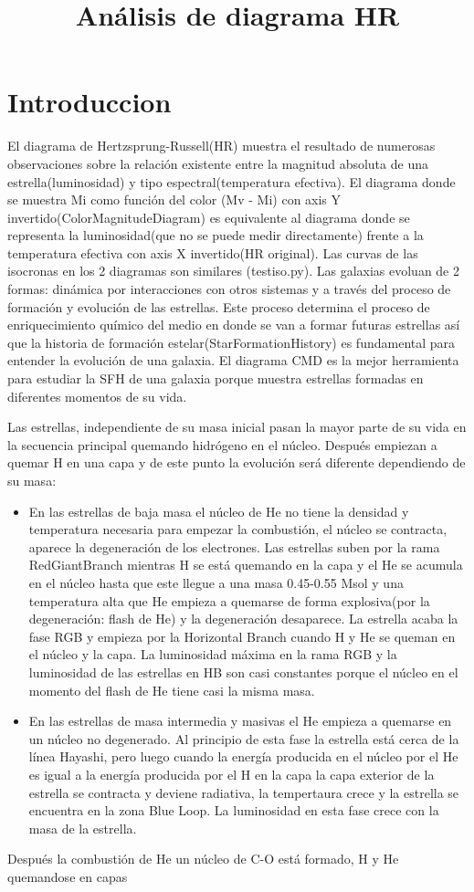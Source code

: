 \documentclass[10pt]{book}
\title{Análisis de diagrama HR}
\date{}
\begin{document}
\section*{Introduccion}



  El diagrama de Hertzsprung-Russell(HR) muestra el resultado de numerosas observaciones sobre la relación existente entre la magnitud absoluta de una estrella(luminosidad) y tipo espectral(temperatura efectiva).
El diagrama donde se muestra Mi como función del color (Mv - Mi) con axis Y invertido(ColorMagnitudeDiagram) es equivalente al diagrama donde se representa la luminosidad(que no se puede medir directamente) frente a la temperatura efectiva con axis X invertido(HR original). Las curvas de las isocronas en los 2 diagramas son similares (testiso.py). 
Las galaxias evoluan de 2 formas: dinámica por interacciones con otros sistemas y a través del proceso de formación y evolución de las estrellas. Este proceso determina el proceso de enriquecimiento químico del medio en donde se van a formar futuras estrellas así que la historia de formación estelar(StarFormationHistory) es fundamental para entender la evolución de una galaxia. 
El diagrama CMD es la mejor herramienta para estudiar la SFH de
una galaxia porque muestra estrellas formadas en diferentes momentos de su vida.

Las estrellas, independiente de su masa inicial pasan la mayor parte de su vida en la secuencia principal quemando hidrógeno en el núcleo. Después empiezan a quemar H en una capa y de este punto la evolución será diferente dependiendo de su masa:
\begin{itemize}
\item En las estrellas de baja masa el núcleo de He no tiene la densidad y temperatura necesaria para empezar la combustión, el núcleo se contracta, aparece la degeneración de los electrones. 
Las estrellas suben por la rama RedGiantBranch mientras H se está quemando en la capa y el He se acumula en el núcleo hasta que este llegue a una masa 0.45-0.55 Msol y una temperatura alta  que He empieza a quemarse de forma explosiva(por la degeneración: flash de He) y la degeneración desaparece. La estrella acaba la fase RGB y empieza por la Horizontal Branch cuando H y He se queman en el núcleo y la capa. La luminosidad máxima en la rama RGB y la luminosidad de las estrellas en HB son casi constantes porque el núcleo en el momento del flash de He  tiene casi la misma masa.
\item En las estrellas de masa intermedia y masivas el He empieza a quemarse en un núcleo no degenerado. Al principio de esta fase la estrella está cerca de la línea Hayashi, pero luego cuando la energía producida en el núcleo por el He es igual a la energía producida por el H en la capa la capa exterior de la estrella se contracta y deviene radiativa, la tempertaura crece y la estrella se encuentra en la zona Blue Loop. La luminosidad en esta fase crece con la masa de la estrella.
\end{itemize}
Después la combustión de He un núcleo de C-O está formado, H y He quemandose en capas
\end{document}
